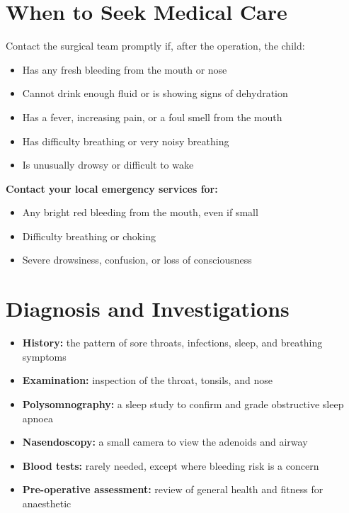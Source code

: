 \section*{When to Seek Medical Care}
Contact the surgical team promptly if, after the operation, the child:

\begin{itemize}
    \item Has any fresh bleeding from the mouth or nose
    \item Cannot drink enough fluid or is showing signs of dehydration
    \item Has a fever, increasing pain, or a foul smell from the mouth
    \item Has difficulty breathing or very noisy breathing
    \item Is unusually drowsy or difficult to wake
\end{itemize}

\textbf{Contact your local emergency services for:}
\begin{itemize}
    \item Any bright red bleeding from the mouth, even if small
    \item Difficulty breathing or choking
    \item Severe drowsiness, confusion, or loss of consciousness
\end{itemize}

\section*{Diagnosis and Investigations}
\begin{itemize}
    \item \textbf{History:} the pattern of sore throats, infections, sleep, and breathing symptoms
    \item \textbf{Examination:} inspection of the throat, tonsils, and nose
    \item \textbf{Polysomnography:} a sleep study to confirm and grade obstructive sleep apnoea
    \item \textbf{Nasendoscopy:} a small camera to view the adenoids and airway
    \item \textbf{Blood tests:} rarely needed, except where bleeding risk is a concern
    \item \textbf{Pre-operative assessment:} review of general health and fitness for anaesthetic
\end{itemize}


